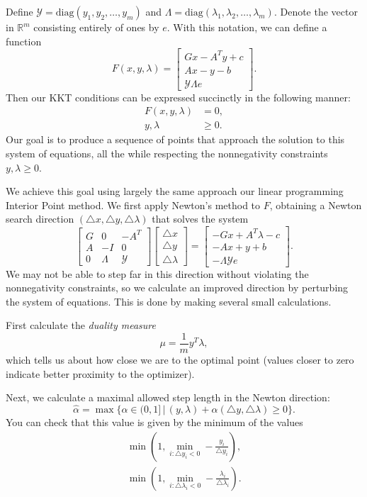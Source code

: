 Define $\mathcal{Y} = \text{diag}(y_1,y_2,\ldots,y_m)$ and $\Lambda = \text{diag}(\lambda_1,\lambda_2,\ldots,\lambda_m)$.
Denote the vector in $\mathbb{R}^m$ consisting entirely of ones by $e$. With this notation, we can define a function
\[
F(x,y,\lambda) =
\begin{bmatrix}
Gx-A^Ty + c\\
Ax-y-b\\
\mathcal{Y}\Lambda e
\end{bmatrix}.
\]
Then our KKT conditions can be expressed succinctly in the following manner:
\begin{align*}
F(x,y,\lambda) &= 0,\\
y,\lambda &\geq 0.
\end{align*}
Our goal is to produce a sequence of points that approach the solution to this system of equations, all the while
respecting the nonnegativity constraints $y,\lambda \geq 0$.

We achieve this goal using largely the same approach our linear programming Interior Point method.
We first apply Newton's method to $F$, obtaining a Newton search direction $(\triangle x, \triangle y, \triangle \lambda)$
that solves the system
\begin{equation}
\begin{bmatrix}
G & 0 & -A^T\\
A & -I & 0\\
0 & \Lambda & \mathcal{Y}
\end{bmatrix}
\begin{bmatrix}
\triangle x\\
\triangle y\\
\triangle \lambda
\end{bmatrix}
=
\begin{bmatrix}
-Gx + A^T\lambda - c\\
-Ax + y + b\\
-\Lambda\mathcal{Y}e
\end{bmatrix}.
\label{eq:affine}
\end{equation}
We may not be able to step far in this direction without violating the nonnegativity constraints, so we calculate
an improved direction by perturbing the system of equations. This is done by making several small calculations.

First calculate the \emph{duality measure}
\[
\mu = \frac{1}{m}y^T\lambda,
\]
which tells us about how close we are to the optimal point (values closer to zero indicate better proximity to the optimizer).

Next, we calculate a maximal allowed step length in the Newton direction:
\[
\hat{\alpha} = \max \{\alpha \in (0,1] \, | \, (y,\lambda) + \alpha(\triangle y, \triangle \lambda) \geq 0\}.
\]
You can check that this value is given by the minimum of the values
\begin{align*}
\min\left(1, \min_{i : \triangle y_i < 0} - \frac{y_i}{\triangle y_i}\right),\\
\min\left(1, \min_{i : \triangle \lambda_i < 0} -\frac{\lambda_i}{\triangle \lambda_i}\right).
\end{align*}

